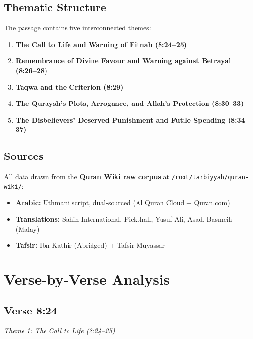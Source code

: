 \documentclass[11pt,a4paper,openany]{book}
\begin{document}
\section{Thematic Structure}
The passage contains five interconnected themes:
\begin{enumerate}
\item \textbf{The Call to Life and Warning of Fitnah (8:24--25)}
\item \textbf{Remembrance of Divine Favour and Warning against Betrayal (8:26--28)}
\item \textbf{Taqwa and the Criterion (8:29)}
\item \textbf{The Quraysh's Plots, Arrogance, and Allah's Protection (8:30--33)}
\item \textbf{The Disbelievers' Deserved Punishment and Futile Spending (8:34--37)}
\end{enumerate}

\section{Sources}
All data drawn from the \textbf{Quran Wiki raw corpus} at \texttt{/root/tarbiyyah/quran-wiki/}:
\begin{itemize}
\item \textbf{Arabic:} Uthmani script, dual-sourced (Al Quran Cloud + Quran.com)
\item \textbf{Translations:} Sahih International, Pickthall, Yusuf Ali, Asad, Basmeih (Malay)
\item \textbf{Tafsir:} Ibn Kathir (Abridged) + Tafsir Muyassar
\end{itemize}

\chapter{Verse-by-Verse Analysis}

\section{Verse 8:24}
{\small\color{accent2}\itshape Theme 1: The Call to Life (8:24--25)}
\end{document}
